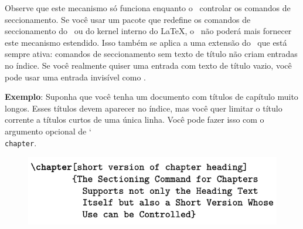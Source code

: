 Observe que este mecanismo só funciona enquanto o \KOMAScript\ controlar os comandos de seccionamento. Se você usar um pacote que redefine os comandos de seccionamento do \KOMAScript\ ou do kernel interno do \LaTeX, o \KOMAScript\ não poderá mais fornecer este mecanismo estendido. Isso também se aplica a uma extensão do \KOMAScript\ que está sempre ativa: comandos de seccionamento sem texto de título não criam entradas no índice. Se você realmente quiser uma entrada com texto de título vazio, você pode usar uma entrada invisível como \mbox{}.

\textbf{Exemplo}: Suponha que você tenha um documento com títulos de capítulo muito longos. Esses títulos devem aparecer no índice, mas você quer limitar o título corrente a títulos curtos de uma única linha. Você pode fazer isso com o argumento opcional de \char`\\\texttt{chap\-ter}.

\begin{figure}[h]
    \centering
    \includegraphics[width=0.60\linewidth]{imagem14.png}
    \label{fig:img14}
\end{figure}



